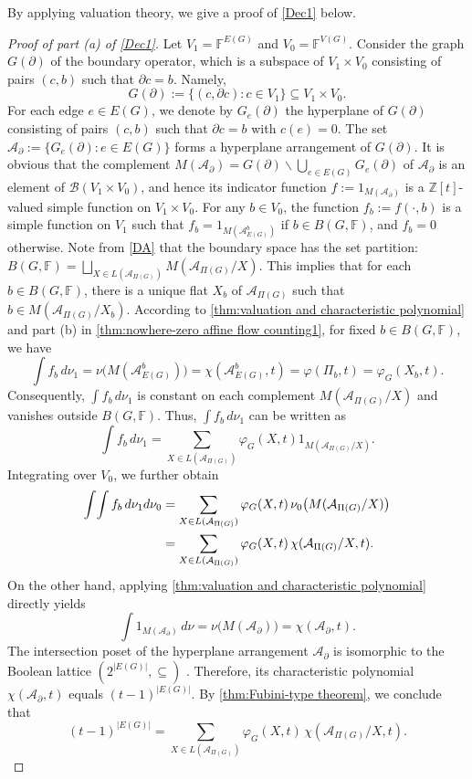 \documentclass[12pt]{article}%
\renewcommand*{\bm}[1]{#1}%
\numberwithin{equation}{section}
\begin{document}
By applying valuation theory, we give a proof of \autoref{Dec1} below.
\begin{proof}[Proof of part (a) of \autoref{Dec1}]
Let $V_1=\mathbb{F}^{E(G)}$ and $V_0=\mathbb{F}^{V(G)}$. Consider the graph $G(\partial)$ of the boundary operator, which is a subspace of $V_1\times V_0$ consisting of pairs $(\bm c,\bm b)$ such that $\partial\bm c=\bm b$. Namely,
\[
G(\partial):=\big\{(\bm c,\partial\bm c):\bm c\in V_1\big\}\subseteq V_1\times V_0.
\]
For each edge $e\in E(G)$, we denote by $G_e(\partial)$ the hyperplane of $G(\partial)$ consisting of pairs $(\bm c,\bm b)$ such that $\partial\bm c=\bm b$ with $\bm c(e)=0$. The set $\mathcal{A}_\partial:=\big\{G_e(\partial):e\in E(G)\big\}$ forms a hyperplane arrangement of $G(\partial)$. It is obvious that the complement $M(\mathcal{A}_\partial)=G(\partial)\smallsetminus\bigcup_{e\in E(G)}G_e(\partial)$ of $\mathcal{A}_\partial$ is an element of $\mathcal{B}(V_1\times V_0)$, and hence its indicator function $f:=1_{M(\mathcal{A}_\partial)}$ is a $\mathbb{Z}[t]$-valued simple function on $V_1\times V_0$. For any $\bm b\in V_0$, the function $f_{\bm b}:=f(\cdot,\bm b)$ is a simple function on $V_1$ such that $f_{\bm b}=1_{M(\mathcal{A}_{E(G)}^{\bm b})}$ if $\bm b\in B(G,\mathbb{F})$, and $f_{\bm b}=0$ otherwise. Note from \eqref{DA} that the boundary space has the set partition:  $B(G,\mathbb{F})=\bigsqcup_{X\in L(\mathcal{A}_{\Pi(G)})}M(\mathcal{A}_{\Pi(G)}/X)$. This implies that for each $\bm b\in B(G,\mathbb{F})$, there is a unique flat $X_{\bm b}$ of $\mathcal{A}_{\Pi(G)}$ such that $\bm b\in M(\mathcal{A}_{\Pi(G)}/X_{\bm b})$. According to \autoref{thm:valuation and characteristic polynomial} and part (b) in \autoref{thm:nowhere-zero affine flow counting1}, for fixed $\bm b\in B(G,\mathbb{F})$, we have
\[
\int f_{\bm b}\,d\nu_1=\nu\big(M(\mathcal{A}_{E(G)}^{\bm b})\big)=\chi(\mathcal{A}_{E(G)}^{\bm b},t)=\varphi(\Pi_{\bm b},t)=\varphi_G(X_{\bm b},t).
\]
Consequently, $\int f_{\bm b}\,d\nu_1$ is constant on each complement  $M(\mathcal{A}_{\Pi(G)}/X)$ and vanishes outside $B(G,\mathbb{F})$. Thus, $\int f_{\bm b}\,d\nu_1$ can be written as
\[
\int f_{\bm b}\,d\nu_1=\sum_{X\in L(\mathcal{A}_{\Pi(G)})}\varphi_G(X,t)1_{M(\mathcal{A}_{\Pi(G)}/X)}.
\]
Integrating over $V_0$, we further obtain
\begin{align*}
\int\!\int f_{\bm b}\,d\nu_1d\nu_0
&=\sum_{X\in L(\mathcal{A}_{\Pi(G)})}\varphi_G(X,t)\,\nu_0\big(M(\mathcal{A}_{\Pi(G)}/X)\big)\notag\\
&=\sum_{X\in L(\mathcal{A}_{\Pi(G)})} \varphi_G(X,t)\,\chi(\mathcal{A}_{\Pi(G)}/X,t).
\end{align*}
On the other hand, applying \autoref{thm:valuation and characteristic polynomial} directly yields
\[
\int 1_{M(\mathcal{A}_\partial)}\,d\nu=\nu\big(M(\mathcal{A}_\partial)\big)=\chi(\mathcal{A}_\partial,t).
\]
The intersection poset of the hyperplane arrangement $\mathcal{A}_\partial$ is isomorphic to the Boolean lattice $(2^{|E(G)|},\subseteq)$ . Therefore, its characteristic polynomial $\chi(\mathcal{A}_\partial,t)$ equals $(t-1)^{|E(G)|}$. By \autoref{thm:Fubini-type theorem}, we conclude that
\[
(t-1)^{|E(G)|}=\sum_{X\in L(\mathcal{A}_{\Pi(G)})}\varphi_G(X,t)\,\chi(\mathcal{A}_{\Pi(G)}/X,t).
\]


\end{proof}
\end{document}

